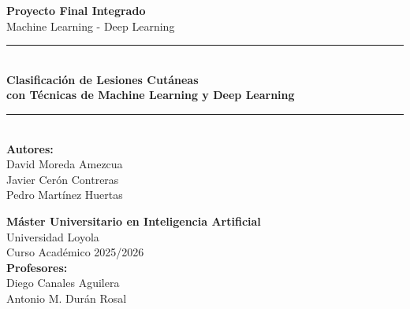 \documentclass[12pt,a4paper]{article}
\begin{document}
\begin{titlepage}
    \centering
    \vspace*{1cm}

    \begin{figure}[H]
        \centering
    \end{figure}

    \vspace{1cm}

    {\Huge\bfseries Proyecto Final Integrado\\[0.5cm]}
    {\LARGE Machine Learning - Deep Learning\\[1cm]}

    \rule{\textwidth}{1pt}\\[0.5cm]

    {\Large\bfseries Clasificación de Lesiones Cutáneas\\
    con Técnicas de Machine Learning y Deep Learning\\[0.5cm]}

    \rule{\textwidth}{1pt}\\[2cm]

    {\Large\textbf{Autores:}}\\[0.5cm]
    {\large
    David Moreda Amezcua\\[0.3cm]
    Javier Cerón Contreras\\[0.3cm]
    Pedro Martínez Huertas\\[1.5cm]
    }

    {\Large\textbf{Máster Universitario en Inteligencia Artificial}}\\[0.3cm]
    {\large Universidad Loyola}\\[0.3cm]
    {\large Curso Académico 2025/2026}\\[1.5cm]

    {\large\textbf{Profesores:}}\\[0.3cm]
    {\normalsize Diego Canales Aguilera\\
    Antonio M. Durán Rosal}

    \vfill
\end{titlepage}

\tableofcontents
\newpage

\end{document}
